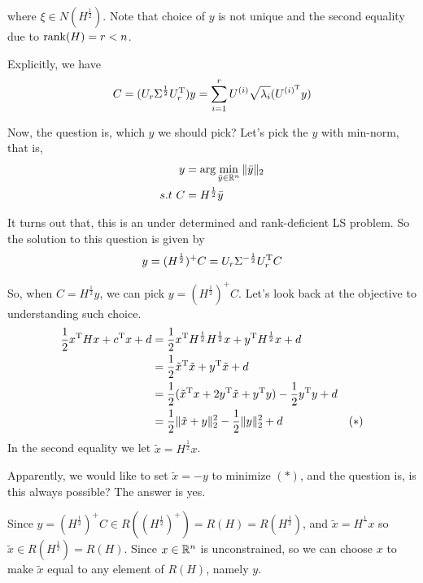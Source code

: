 where $\xi \in N(H^{\frac{1}{2}})$. Note that choice of $y$ is not unique and the second equality due to $\operatorname{rank}(H)= r<n$. 

Explicitly, we have 
\begin{equation*}
C = (U_r\Sigma^{\frac{1}{2}}U_r^{{\rm T}})y = \sum^r_{i=1}U^{(i)}\sqrt{\lambda_i}(U^{(i)^{{\rm T}}}y)
\end{equation*}

Now, the question is, which $y$ we should pick? Let's pick the $y$ with min-norm, that is, 
\begin{align*}
y &=\arg\min_{\bar{y}\in\mathbb{R}^n}\Vert \bar{y}\Vert_2\\
s.t\  C &= H^{\frac{1}{2}}\bar{y}
\end{align*}

It turns out that, this is an under determined and rank-deficient LS problem. So the solution to this question is given by
$$y = (H^{\frac{1}{2}})^+C = U_r \Sigma^{-\frac{1}{2}} U_r^{{\rm T}} C$$


So, when $C = H^{\frac{1}{2}}y$, we can pick $y = (H^{\frac{1}{2}})^+C$. Let's look back at the objective to understanding such choice.
\begin{align*}
\frac{1}{2}x^{{\rm T}}Hx + c^{{\rm T}}x + d &= \frac{1}{2}x^{{\rm T}}H^{\frac{1}{2}}H^{\frac{1}{2}}x+y^{{\rm T}}H^{\frac{1}{2}}x + d\\
&= \frac{1}{2}\tilde{x}^{{\rm T}}\tilde{x} + y^{{\rm T}}\tilde{x} + d\\
&= \frac{1}{2}(\tilde{x}^{{\rm T}}x+2y^{{\rm T}}\tilde{x}+y^{{\rm T}}y) - \frac{1}{2}y^{{\rm T}}y + d \\
&= \frac{1}{2}\Vert\tilde{x}+y\Vert^2_2 - \frac{1}{2}\Vert y \Vert^2_2 + d &(*)
\end{align*}
In the second equality we let $\tilde{x} = H^{\frac{1}{2}} x$.

Apparently, we would like to set $\tilde{x} = -y$ to minimize $(*)$, and the question is, is this always possible? The answer is yes.

Since $y = (H^{\frac{1}{2}})^+C\in R((H^{\frac{1}{2}})^+) = R(H) = R(H^{\frac{1}{2}})$, and $\tilde{x}=H^{\frac{1}{}} x$ so $\tilde{x} \in R\left(H^{\frac{1}{2}}\right) = R(H)$. Since $x\in \mathbb{R}^n$ is unconstrained, so we can choose $x$ to make $\tilde{x}$ equal to any element of $R(H)$, namely $y$. 

